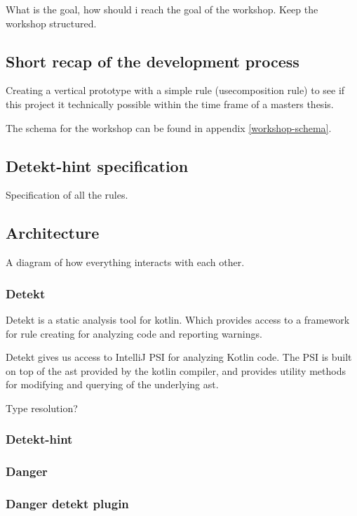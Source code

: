 \documentclass{article}
\begin{document}
What is the goal, how should i reach the goal of the workshop. Keep the workshop structured.

\subsection{}

\subsection{Short recap of the development process}
Creating a vertical prototype with a simple rule (usecomposition rule) to see if this project it technically possible within the time frame of a masters thesis. 

The schema for the workshop can be found in appendix \ref{workshop-schema}.


\subsection{Detekt-hint specification}
Specification of all the rules.

\subsection{Architecture}
A diagram of how everything interacts with each other.

\subsubsection{Detekt}
Detekt is a static analysis tool for kotlin. Which provides access to a framework for rule creating for analyzing code and reporting warnings.

Detekt gives us access to IntelliJ PSI for analyzing Kotlin code. The PSI is built on top of the \gls{ast} provided by the kotlin compiler, and provides utility methods for modifying and querying of the underlying \gls{ast}.

Type resolution?

\subsubsection{Detekt-hint}

\subsubsection{Danger}

\subsubsection{Danger detekt plugin}
\end{document}
